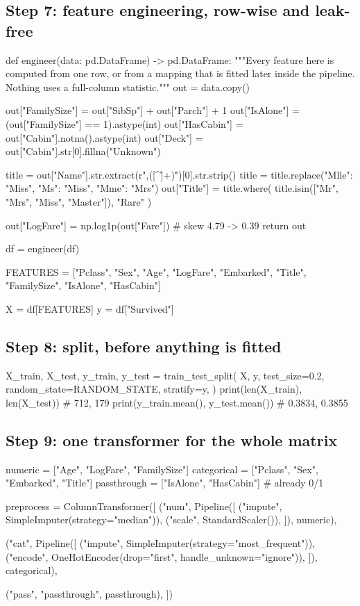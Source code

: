 \documentclass[11pt,a4paper]{article}
\begin{document}
\subsection{Step 7: feature engineering, row-wise and leak-free}

\begin{py}
def engineer(data: pd.DataFrame) -> pd.DataFrame:
    """Every feature here is computed from one row, or from a mapping that is
    fitted later inside the pipeline. Nothing uses a full-column statistic."""
    out = data.copy()

    out["FamilySize"] = out["SibSp"] + out["Parch"] + 1
    out["IsAlone"]    = (out["FamilySize"] == 1).astype(int)
    out["HasCabin"]   = out["Cabin"].notna().astype(int)
    out["Deck"]       = out["Cabin"].str[0].fillna("Unknown")

    title = out["Name"].str.extract(r",\s*([^\.]+)\.")[0].str.strip()
    title = title.replace({"Mlle": "Miss", "Ms": "Miss", "Mme": "Mrs"})
    out["Title"] = title.where(
        title.isin(["Mr", "Mrs", "Miss", "Master"]), "Rare"
    )

    out["LogFare"] = np.log1p(out["Fare"])      # skew 4.79 -> 0.39
    return out


df = engineer(df)

FEATURES = ["Pclass", "Sex", "Age", "LogFare", "Embarked",
            "Title", "FamilySize", "IsAlone", "HasCabin"]

X = df[FEATURES]
y = df["Survived"]
\end{py}

\subsection{Step 8: split, before anything is fitted}

\begin{py}
X_train, X_test, y_train, y_test = train_test_split(
    X, y, test_size=0.2, random_state=RANDOM_STATE, stratify=y,
)
print(len(X_train), len(X_test))              # 712, 179
print(y_train.mean(), y_test.mean())          # 0.3834, 0.3855
\end{py}

\subsection{Step 9: one transformer for the whole matrix}

\begin{py}
numeric     = ["Age", "LogFare", "FamilySize"]
categorical = ["Pclass", "Sex", "Embarked", "Title"]
passthrough = ["IsAlone", "HasCabin"]         # already 0/1

preprocess = ColumnTransformer([
    ("num", Pipeline([
        ("impute", SimpleImputer(strategy="median")),
        ("scale",  StandardScaler()),
    ]), numeric),

    ("cat", Pipeline([
        ("impute", SimpleImputer(strategy="most_frequent")),
        ("encode", OneHotEncoder(drop="first", handle_unknown="ignore")),
    ]), categorical),

    ("pass", "passthrough", passthrough),
])
\end{py}
\end{document}
